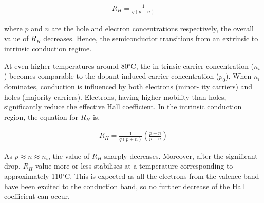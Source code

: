 \begin{align}
    R_H = \frac{1}{q(p-n)}
\end{align}

where $p$ and $n$ are the  hole and electron concentrations respectively, the overall value of $R_H$ decreases. Hence, the semiconductor transitions from an extrinsic to intrinsic conduction regime.

At even higher temperatures around 80$^\circ$C, the in
trinsic carrier concentration ($n_i$) becomes comparable to the dopant-induced carrier concentration ($p_0$). When $n_i$ dominates,
conduction is influenced by both electrons (minor-
ity carriers) and holes (majority carriers). Electrons,
having higher mobility than holes, significantly reduce the effective Hall coefficient. In the intrinsic conduction region, the equation for $R_H$ is,

\begin{align}
    R_H = \frac{1}{q(p+n)}\left(\frac{p-n}{p+n}\right)
\end{align}

As $p\approx n \approx n_i$, the value of $R_H$ sharply decreases. Moreover, after the significant drop, $R_H$ value more or less stabilises at a temperature corresponding to approximately 110$^\circ$C. This is expected as all the electrons from the valence band have been excited to the conduction band, so no further decrease of the Hall coefficient can occur.